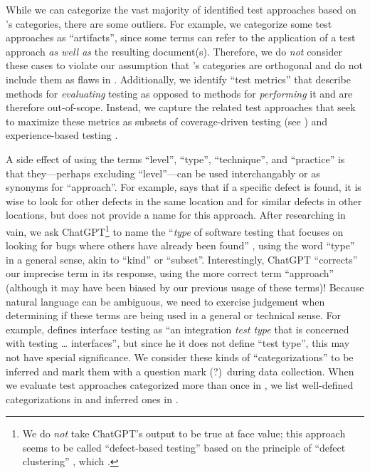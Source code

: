 \fi
While we can categorize the vast majority of identified test approaches
based on \citet{IEEE2022}'s categories, there are some outliers. For example,
we categorize some test approaches as ``artifacts'',
since some terms can refer to the application of a
test approach \emph{as well as} the resulting document(s). Therefore, we
do \emph{not} consider these cases to violate our assumption that
\citet{IEEE2022}'s categories are orthogonal and do not include them as flaws%
 in .
\ifnotpaper
    Additionally, we identify ``test metrics'' that
    describe methods for \emph{evaluating} testing as opposed to methods for
    \emph{performing} it and are therefore out-of-scope. Instead,
    we capture the related test approaches that seek to maximize these
    metrics as subsets of coverage-driven testing (see ) and
    experience-based testing \citep[p.~34]{IEEE2022}.
\fi

A side effect of using the terms ``level'', ``type'', ``technique'', and
``practice'' is that they---perhaps excluding ``level''---can
be used interchangably or as synonyms for ``approach''. For example,
\citet[p.~88]{Patton2006} says that if a specific defect is found, it is wise
to look for other defects in the same location and for similar defects in other
locations, but does not provide a name for this approach. After researching in
vain, we ask ChatGPT\footnote{We do \emph{not} take ChatGPT's output to be
    true at face value; this approach seems to be called ``defect-based
    testing'' based on the principle of ``defect clustering''
    \citep{ChatGPT2024}, which \citet{RusEtAl2008} .}
to name the ``\emph{type} of software testing that focuses on looking for bugs
where others have already been found''
\ifnotpaper \citep[emphasis added]{ChatGPT2024}\else \cite{ChatGPT2024}\fi%
,
using the word ``type'' in a general sense, akin to ``kind'' or ``subset''.
Interestingly, ChatGPT ``corrects'' our imprecise term in its response,
using the more correct term ``approach'' (although it may have been biased by
our previous usage of these terms)! Because natural language can be ambiguous,
we need to exercise judgement when determining if these terms are being used
in a general or technical sense. For example,
\citet[p.~45\ifnotpaper, emphasis added\fi]{Kam2008}
defines interface testing as ``an integration \emph{test type} that is
concerned with testing \dots{} interfaces'', but since \ifnotpaper he \else it
\fi does not define ``test type'', this may not have special significance.%
\ifnotpaper\afterpage{\begin{landscape}%
            \otherCatsTable{}%
        \end{landscape}} We consider these kinds of ``categorizations'' to be
    inferred and mark them with a question mark (?)~during data collection.
    When we evaluate test approaches categorized more than once in
    , we list well-defined categorizations in
     and inferred ones in .


